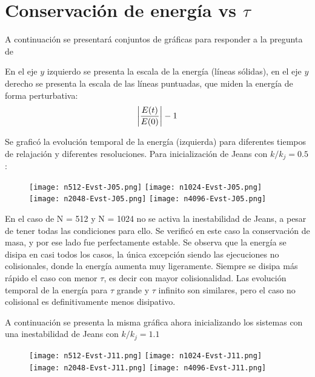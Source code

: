 \documentclass[notitlepage,letterpaper,12pt]{article} %
\begin{document}
\section{Conservación de energía vs $\tau$}
A continuación se presentará conjuntos de gráficas para responder a la pregunta de 
 
En el eje $y$ izquierdo se presenta la escala de la energía (líneas sólidas), en el eje $y$ derecho se presenta la escala de las líneas puntuadas, que miden la energía de forma perturbativa:
\begin{equation}
\abs{\frac{E(t)}{E(0)}} -1
\end{equation}

Se graficó la evolución temporal de la energía (izquierda) para diferentes tiempos de relajación y diferentes resoluciones.
Para inicialización de Jeans con $k/k_j = 0.5$:

\begin{figure}[h]
  \centering
   \texttt{[image: n512-Evst-J05.png]}
   \texttt{[image: n1024-Evst-J05.png]}
   \texttt{[image: n2048-Evst-J05.png]}
   \texttt{[image: n4096-Evst-J05.png]}
  \label{Evst para n}
\end{figure}

En el caso de N = 512 y N = 1024 no se activa la inestabilidad de Jeans, a pesar de tener todas las condiciones para ello.
Se verificó en este caso la conservación de masa, y por ese lado fue perfectamente estable. 
Se observa que la energía se disipa en casi todos los casos, la única excepción siendo las ejecuciones no colisionales, donde la energía aumenta muy ligeramente.
Siempre se disipa más rápido el caso con menor $\tau$, es decir con mayor colisionalidad.
Las evolución temporal de la energía para $\tau$ grande y $\tau$ infinito son similares, pero el caso no colisional es definitivamente menos disipativo.


A continuación se presenta la misma gráfica ahora inicializando los sistemas con una inestabilidad de Jeans con $k/k_j = 1.1$

\begin{figure}[h]
  \centering
   \texttt{[image: n512-Evst-J11.png]}
   \texttt{[image: n1024-Evst-J11.png]}
   \texttt{[image: n2048-Evst-J11.png]}
   \texttt{[image: n4096-Evst-J11.png]}
  \label{Evst para n}
\end{figure}
\end{document}

